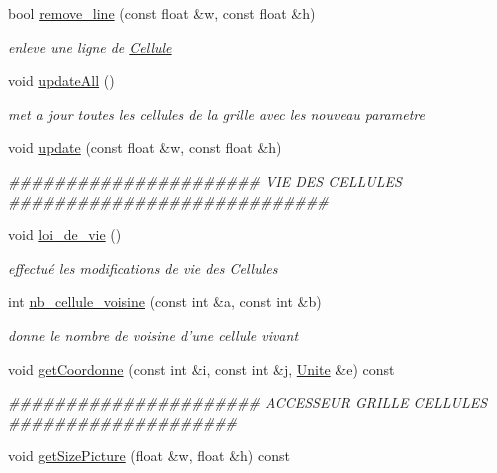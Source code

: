 \begin{DoxyCompactItemize}
bool \hyperlink{classGrilleCellule_a2a5dadf5789d155ac1a7cb644dbd78bf}{remove\_\-line} (const float \&w, const float \&h)
\begin{DoxyCompactList}\small\item\em enleve une ligne de \hyperlink{classCellule}{Cellule} \end{DoxyCompactList}\item 
void \hyperlink{classGrilleCellule_a68690f60c56ec2e76d0f001190ffed61}{updateAll} ()
\begin{DoxyCompactList}\small\item\em met a jour toutes les cellules de la grille avec les nouveau parametre \end{DoxyCompactList}\item 
void \hyperlink{classGrilleCellule_a185e855f7598a4515c93f3c6449c1d7c}{update} (const float \&w, const float \&h)
\begin{DoxyCompactList}\small\item\em \#\#\#\#\#\#\#\#\#\#\#\#\#\#\#\#\#\#\#\#\#\# VIE DES CELLULES \#\#\#\#\#\#\#\#\#\#\#\#\#\#\#\#\#\#\#\#\#\#\#\#\#\#\#\# \end{DoxyCompactList}\item 
void \hyperlink{classGrilleCellule_a7adaf16eefb7c54827d815e914117f8f}{loi\_\-de\_\-vie} ()
\begin{DoxyCompactList}\small\item\em effectué les modifications de vie des Cellules \end{DoxyCompactList}\item 
int \hyperlink{classGrilleCellule_a7365feb6a0ce9b2f2fd29ea554b8321f}{nb\_\-cellule\_\-voisine} (const int \&a, const int \&b)
\begin{DoxyCompactList}\small\item\em donne le nombre de voisine d'une cellule vivant \end{DoxyCompactList}\item 
void \hyperlink{classGrilleCellule_af46bf97dd49a49678a615c12986f1682}{getCoordonne} (const int \&i, const int \&j, \hyperlink{classUnite}{Unite} \&e) const 
\begin{DoxyCompactList}\small\item\em \#\#\#\#\#\#\#\#\#\#\#\#\#\#\#\#\#\#\#\#\#\# ACCESSEUR GRILLE CELLULES \#\#\#\#\#\#\#\#\#\#\#\#\#\#\#\#\#\#\#\# \end{DoxyCompactList}\item 
void \hyperlink{classGrilleCellule_a55cb72fdf8b631b307a2d663d6542542}{getSizePicture} (float \&w, float \&h) const 

\end{DoxyCompactItemize}
